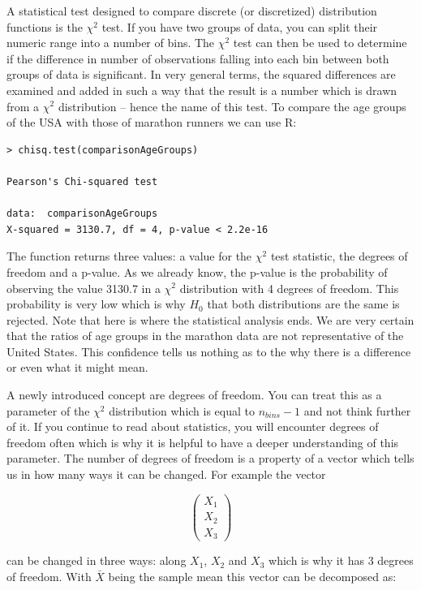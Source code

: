 \documentclass{tufte-book} %
\begin{document}
A statistical test designed to compare discrete (or discretized) distribution functions is the $\chi^2$ test. If you have two groups of data, you can split their numeric range into a number of bins. The $\chi^2$ test can then be used to determine if the difference in number of observations falling into each bin between both groups of data is significant. In very general terms, the squared differences are examined and added in such a way that the result is a number which is drawn from a $\chi^2$ distribution -- hence the name of this test. To compare the age groups of the USA with those of marathon runners we can use R:

\begin{Verbatim}
> chisq.test(comparisonAgeGroups)

Pearson's Chi-squared test

data:  comparisonAgeGroups
X-squared = 3130.7, df = 4, p-value < 2.2e-16
\end{Verbatim}

The function returns three values: a value for the $\chi^2$ test statistic, the degrees of freedom and a \hbox{p-value}. As we already know, the \hbox{p-value} is the probability of observing the value 3130.7 in a $\chi^2$ distribution with 4 degrees of freedom. This probability is very low which is why $H_0$ that both distributions are the same is rejected. Note that here is where the statistical analysis ends. We are very certain that the ratios of age groups in the marathon data are not representative of the United States. This confidence tells us nothing as to the why there is a difference or even what it might mean. 

A newly introduced concept are degrees of freedom. You can treat this as a parameter of the $\chi^2$ distribution which is equal to $n_{bins} - 1$ and not think further of it. If you continue to read about statistics, you will encounter degrees of freedom often which is why it is helpful to have a deeper understanding of this parameter. The number of degrees of freedom is a property of a vector which tells us in how many ways it can be changed. For example the vector 

\begin{equation}
\left(
\begin{array}{c}
X_1 \\
X_2 \\
X_3 
\end{array}
\right)
\end{equation}

can be changed in three ways: along $X_1$, $X_2$ and $X_3$ which is why it has 3 degrees of freedom. With $\bar{X}$ being the sample mean this vector can be decomposed as:
\end{document}
